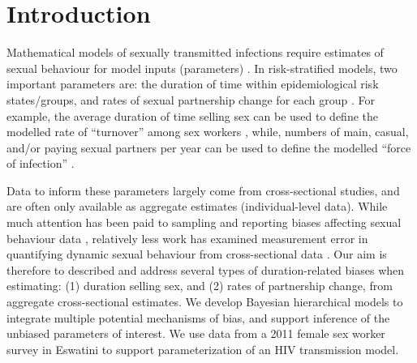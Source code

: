 \section{Introduction}
Mathematical models of sexually transmitted infections require
estimates of sexual behaviour for model inputs (parameters) \cite{Garnett2002}.
In risk-stratified models, two important parameters are:
the duration of time within epidemiological risk states/groups, and
rates of sexual partnership change for each group
\cite{Garnett2002,Watts2010,Boily2015,Knight2020}.
For example, the average duration of time selling sex can be used to define
the modelled rate of ``turnover'' among sex workers \cite{Knight2020},
while, numbers of main, casual, and/or paying sexual partners per year
can be used to define the modelled ``force of infection'' \cite{Boily2015}.
\par
Data to inform these parameters largely come from cross-sectional studies,
and are often only available as aggregate estimates (\vs individual-level data).
While much attention has been paid to
sampling and reporting biases affecting sexual behaviour data \cite{Fenton2001,Langhaug2010},
relatively less work has examined measurement error
in quantifying dynamic sexual behaviour from cross-sectional data \cite{Burington2010,Fazito2012}.
Our aim is therefore to described and address
several types of duration-related biases when estimating:
(1) duration selling sex, and (2) rates of partnership change,
from aggregate cross-sectional estimates.
We develop Bayesian hierarchical models to
integrate multiple potential mechanisms of bias, and
support inference of the unbiased parameters of interest.
We use data from a 2011 female sex worker survey in Eswatini \cite{Yam2013}
to support parameterization of an HIV transmission model.
